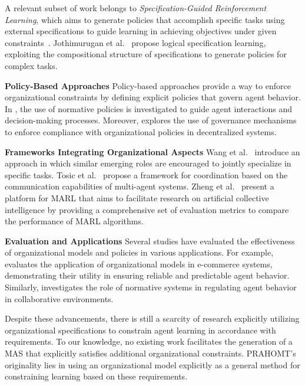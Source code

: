 \documentclass[conference]{IEEEtran}
\begin{document}
A relevant subset of work belongs to \emph{Specification-Guided Reinforcement Learning}, which aims to generate policies that accomplish specific tasks using external specifications to guide learning in achieving objectives under given constraints~\cite{Bansal2022}. Jothimurugan et al.~\cite{Jothimurugan2021} propose logical specification learning, exploiting the compositional structure of specifications to generate policies for complex tasks.

\textbf{Policy-Based Approaches} \quad
Policy-based approaches provide a way to enforce organizational constraints by defining explicit policies that govern agent behavior. In \cite{krupanski2015norm}, the use of normative policies is investigated to guide agent interactions and decision-making processes. Moreover, \cite{vos2020governing} explores the use of governance mechanisms to enforce compliance with organizational policies in decentralized systems.

\textbf{Frameworks Integrating Organizational Aspects} \quad
Wang et al.~\cite{Wang2020} introduce an approach in which similar emerging roles are encouraged to jointly specialize in specific tasks. Tosic et al.~\cite{Tosic2010} propose a framework for coordination based on the communication capabilities of multi-agent systems. Zheng et al.~\cite{Zheng2018} present a platform for MARL that aims to facilitate research on artificial collective intelligence by providing a comprehensive set of evaluation metrics to compare the performance of MARL algorithms.

\textbf{Evaluation and Applications} \quad
Several studies have evaluated the effectiveness of organizational models and policies in various applications. For example, \cite{dignum2004agent} evaluates the application of organizational models in e-commerce systems, demonstrating their utility in ensuring reliable and predictable agent behavior. Similarly, \cite{andrighetto2013normative} investigates the role of normative systems in regulating agent behavior in collaborative environments.

Despite these advancements, there is still a scarcity of research explicitly utilizing organizational specifications to constrain agent learning in accordance with requirements. To our knowledge, no existing work facilitates the generation of a MAS that explicitly satisfies additional organizational constraints. PRAHOMT's originality lies in using an organizational model explicitly as a general method for constraining learning based on these requirements.
\end{document}
